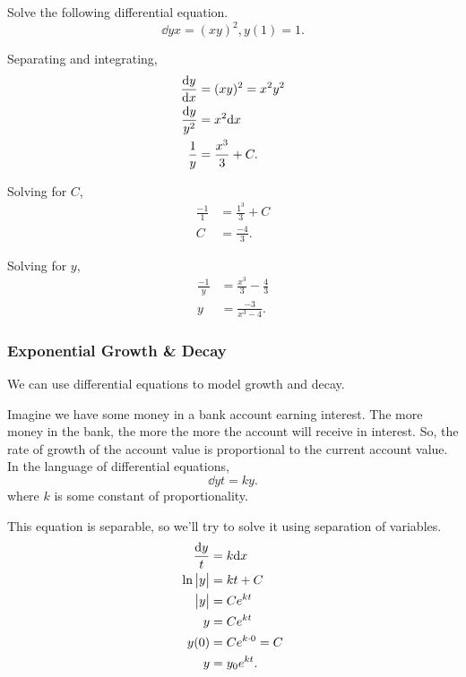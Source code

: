 \begin{example}
	Solve the following differential equation.
	\begin{equation*}
		\dd{y}{x} = (xy)^2, y(1)=1.
	\end{equation*}
\end{example}
\begin{answer}
	Separating and integrating,
	\begin{align*}
		\frac{\mathrm{d} y}{\mathrm{d} x} &= (xy)^2 = x^2y^2 \\
		\frac{\mathrm{d} y}{y^2} &= x^2\mathrm{d} x \\
		\frac{1}{y} &= \frac{x^3}{3} + C. \\
	\end{align*}
	
	Solving for $C$,
	\begin{align*}
		\frac{-1}{1} &= \frac{1^3}{3} + C \\
		C &= \frac{-4}{3}.
	\end{align*}
	
	Solving for $y$,
	\begin{align*}
		\frac{-1}{y} &= \frac{x^3}{3} - \frac{4}{3} \\
		y &= \frac{-3}{x^3 - 4}.
	\end{align*}
\end{answer}

\subsubsection{Exponential Growth \& Decay}
We can use differential equations to model growth and decay.

\begin{example}
	Imagine we have some money in a bank account earning interest.
	The more money in the bank, the more the more the account will receive in interest.
	So, the rate of growth of the account value is proportional to the current account value.
	In the language of differential equations,
	\begin{equation*}
		\dd{y}{t} = ky.
	\end{equation*}
	where $k$ is some constant of proportionality.
\end{example}
\begin{answer}
	This equation is separable, so we'll try to solve it using separation of variables.
	\begin{align*}
		\frac{\mathrm{d} y}{t} &= k\mathrm{d} x \\
		\ln{\big\lvert y \big\rvert} &= kt + C \\
		\big\lvert y \big\rvert &= Ce^{kt} \\
		y &= Ce^{kt} \\
		y(0) &= Ce^{k\cdot 0} = C \\
		y &= y_0e^{kt}.
	\end{align*}
\end{answer}

